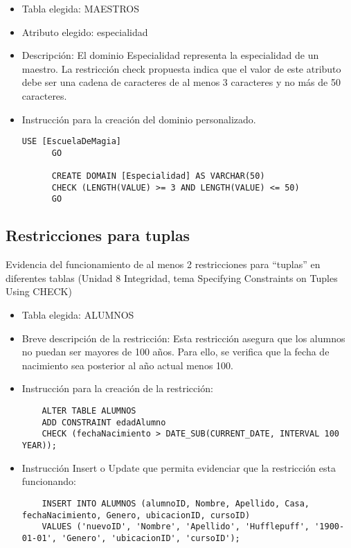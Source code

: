 \begin{itemize}
    \item Tabla elegida: MAESTROS
    \item Atributo elegido: especialidad
    \item Descripción: El dominio Especialidad representa la especialidad de un maestro. La restricción check propuesta indica que el valor de este atributo debe ser una cadena de caracteres de al menos 3 caracteres y no más de 50 caracteres.
    \item Instrucción para la creación del dominio personalizado.
    
    \begin{lstlisting}[caption={Tablas para la BdDatos}, label={lst:sql_estadios}]
      USE [EscuelaDeMagia]
      GO

      CREATE DOMAIN [Especialidad] AS VARCHAR(50)
      CHECK (LENGTH(VALUE) >= 3 AND LENGTH(VALUE) <= 50)
      GO
    \end{lstlisting}    
\end{itemize}



\subsection{Restricciones para tuplas}

Evidencia del funcionamiento de al menos 2 restricciones para “tuplas” en diferentes tablas (Unidad 8 Integridad, tema Specifying Constraints on Tuples Using CHECK)

\begin{itemize}
    \item Tabla elegida: ALUMNOS
    \item Breve descripción de la restricción: Esta restricción asegura que los alumnos no puedan ser mayores de 100 años. Para ello, se verifica que la fecha de nacimiento sea posterior al año actual menos 100.
    \item Instrucción para la creación de la restricción:
    \begin{verbatim}
    ALTER TABLE ALUMNOS
    ADD CONSTRAINT edadAlumno
    CHECK (fechaNacimiento > DATE_SUB(CURRENT_DATE, INTERVAL 100 YEAR));
    \end{verbatim}
    \item Instrucción Insert o Update que permita evidenciar que la restricción esta funcionando:
    \begin{verbatim}
    INSERT INTO ALUMNOS (alumnoID, Nombre, Apellido, Casa, fechaNacimiento, Genero, ubicacionID, cursoID)
    VALUES ('nuevoID', 'Nombre', 'Apellido', 'Hufflepuff', '1900-01-01', 'Genero', 'ubicacionID', 'cursoID');
    \end{verbatim}  
\end{itemize}


